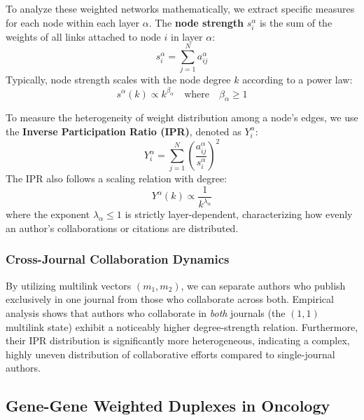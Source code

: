 To analyze these weighted networks mathematically, we extract specific measures for each node within each layer \(\alpha\). The \textbf{node strength} \(s_i^\alpha\) is the sum of the weights of all links attached to node \(i\) in layer \(\alpha\):
\[
    s_i^\alpha = \sum_{j=1}^N a_{ij}^\alpha
\]
Typically, node strength scales with the node degree \(k\) according to a power law:
\[
    s^\alpha(k) \propto k^{\beta_\alpha} \quad \text{where} \quad \beta_\alpha \geq 1
\]

To measure the heterogeneity of weight distribution among a node's edges, we use the \textbf{Inverse Participation Ratio (IPR)}, denoted as \(Y_i^\alpha\):
\[
    Y_i^\alpha = \sum_{j=1}^N \left( \frac{a_{ij}^\alpha}{s_i^\alpha} \right)^2
\]
The IPR also follows a scaling relation with degree:
\[
    Y^\alpha(k) \propto \frac{1}{k^{\lambda_\alpha}}
\]
where the exponent \(\lambda_\alpha \leq 1\) is strictly layer-dependent, characterizing how evenly an author's collaborations or citations are distributed.

\subsubsection{Cross-Journal Collaboration Dynamics}
\label{subsubsec:cross_journal_dynamics}


By utilizing multilink vectors \((m_1, m_2)\), we can separate authors who publish exclusively in one journal from those who collaborate across both. Empirical analysis shows that authors who collaborate in \textit{both} journals (the \((1,1)\) multilink state) exhibit a noticeably higher degree-strength relation. Furthermore, their IPR distribution is significantly more heterogeneous, indicating a complex, highly uneven distribution of collaborative efforts compared to single-journal authors.

\subsection{Gene-Gene Weighted Duplexes in Oncology}
\label{subsec:gene_gene_duplex}

